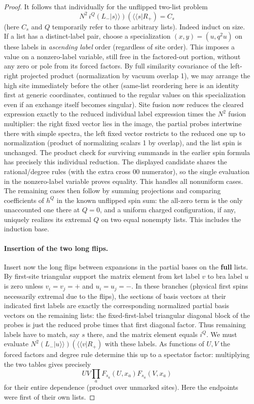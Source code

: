 \begin{proof}
It follows that individually for the unflipped two-list problem
\[
N^2\, i^Q(L_- |s\rangle\rangle)(\langle\langle s|R_+) = C_s
\]
(here $C_s$ and $Q$ temporarily refer to those arbitrary lists). Indeed induct on size. If a list has a distinct-label pair, choose a specialization $(x,y)=(u,q^2u)$ on these labels in \emph{ascending label} order (regardless of site order). This imposes a value on a nonzero-label variable, still free in the factored-out portion, without any zero or pole from its forced factors. By full similarity covariance of the left-right projected product (normalization by vacuum overlap 1), we may arrange the high site immediately before the other (same-list reordering here is an identity first at generic coordinates, continued to the regular values on this specialization even if an exchange itself becomes singular). Site fusion now reduces the cleared expression exactly to the reduced individual label expression times the $N^2$ fusion multiplier: the right fixed vector lies in the image, the partial probes intertwine there with simple spectra, the left fixed vector restricts to the reduced one up to normalization (product of normalizing scalars 1 by overlap), and the list spin is unchanged. The product check for surviving summands in the earlier spin formula has precisely this individual reduction. The displayed candidate shares the rational/degree rules (with the extra cross $00$ numerator), so the single evaluation in the nonzero-label variable proves equality. This handles all nonuniform cases. The remaining cases then follow by summing projections and comparing coefficients of $h^Q$ in the known unflipped spin sum: the all-zero term is the only unaccounted one there at $Q=0$, and a uniform charged configuration, if any, uniquely realizes its extremal $Q$ on two equal nonempty lists. This includes the induction base.

\paragraph{Insertion of the two long flips.}

Insert now the long flips between expansions in the partial bases on the \textbf{full} lists. By first-site triangular support the matrix element from ket label $v$ to bra label $u$ is zero unless $v_i=v_j=+$ and $u_i=u_j=-$. In these branches (physical first spins necessarily extremal due to the flips), the sections of basis vectors at their indicated first labels are exactly the corresponding normalized partial basis vectors on the remaining lists: the fixed-first-label triangular diagonal block of the probes is just the reduced probe times that first diagonal factor. Thus remaining labels have to match, say $s$ there, and the matrix element equals $i^Q$. We must evaluate $N^2(L_-|u\rangle\rangle)(\langle\langle v|R_+)$ with these labels. As functions of $U,V$ the forced factors and degree rule determine this up to a spectator factor: multiplying the two tables gives precisely
\[
UV\prod_a F_{s_a}(U,x_a) F_{s_a}(V,x_a)
\]
for their entire dependence (product over unmarked sites). Here the endpoints were first of their own lists.


\end{proof}
